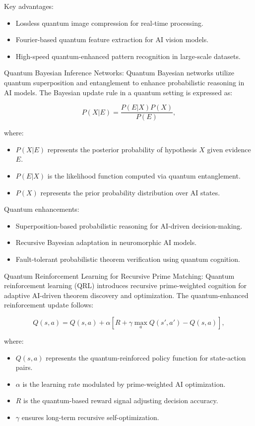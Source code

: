 Key advantages:
\begin{itemize}
    \item Lossless quantum image compression for real-time processing.
    \item Fourier-based quantum feature extraction for AI vision models.
    \item High-speed quantum-enhanced pattern recognition in large-scale datasets.
\end{itemize}

\pa Quantum Bayesian Inference Networks: Quantum Bayesian networks utilize quantum superposition and entanglement to enhance probabilistic reasoning in AI models. The Bayesian update rule in a quantum setting is expressed as:

\begin{equation}
P(X | E) = \frac{P(E | X) P(X)}{P(E)},
\end{equation}

where:
\begin{itemize}
    \item $P(X | E)$ represents the posterior probability of hypothesis $X$ given evidence $E$.
    \item $P(E | X)$ is the likelihood function computed via quantum entanglement.
    \item $P(X)$ represents the prior probability distribution over AI states.
\end{itemize}

Quantum enhancements:
\begin{itemize}
    \item Superposition-based probabilistic reasoning for AI-driven decision-making.
    \item Recursive Bayesian adaptation in neuromorphic AI models.
    \item Fault-tolerant probabilistic theorem verification using quantum cognition.
\end{itemize}

\pa Quantum Reinforcement Learning for Recursive Prime Matching: Quantum reinforcement learning (QRL) introduces recursive prime-weighted cognition for adaptive AI-driven theorem discovery and optimization. The quantum-enhanced reinforcement update follows:

\begin{equation}
Q(s, a) = Q(s, a) + \alpha \left[ R + \gamma \max_a Q(s', a') - Q(s, a) \right],
\end{equation}

where:
\begin{itemize}
    \item $Q(s, a)$ represents the quantum-reinforced policy function for state-action pairs.
    \item $\alpha$ is the learning rate modulated by prime-weighted AI optimization.
    \item $R$ is the quantum-based reward signal adjusting decision accuracy.
    \item $\gamma$ ensures long-term recursive self-optimization.
\end{itemize}

